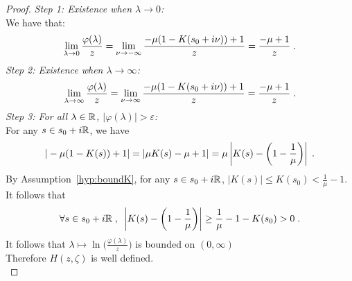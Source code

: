 \documentclass[11pt]{amsart}
\begin{document}
\begin{proof}
\textit{Step 1: Existence when $\lambda \to 0$:}\\
We have that: 
\begin{align*}
    \lim_{\lambda \to 0}\frac{\varphi(\lambda)}{z} = \lim_{\nu\to-\infty}\frac{-\mu(1-K(s_0+i\nu))+1}{z} = \frac{-\mu+1}{z}
    \; .
\end{align*}
\textit{Step 2: Existence when $\lambda \to \infty$:}
\begin{align*}
    \lim_{\lambda \to \infty}\frac{\varphi(\lambda)}{z} = \lim_{\nu\to\infty}\frac{-\mu(1-K(s_0+i\nu))+1}{z} = \frac{-\mu+1}{z}
    \; .
\end{align*}
\textit{Step 3: For all $\lambda \in \mathbb{R}$, $|\varphi(\lambda)| > \varepsilon$: }\\
For any $s \in s_0 + i\mathbb{R}$, we have
    \begin{align*}
        |-\mu(1-K(s))+1| = |\mu K(s) - \mu + 1| = \mu \left|K(s) - \left(1-\frac{1}{\mu}\right)\right|
        \; .
    \end{align*}
By Assumption~\ref{hyp:boundK}, for any $s \in s_0 + i\mathbb{R}$, $|K(s)| \leq K(s_0) < \frac{1}{\mu} - 1$. It follows that
\begin{align*}
    \forall s \in s_0 + i\mathbb{R}
    \; , \enspace
    \left|K(s) - \left(1-\frac{1}{\mu}\right)\right| \geq \frac{1}\mu - 1 - K(s_0) > 0
    \; .
\end{align*}
It follows that $\lambda \mapsto \ln\Big(\frac{\varphi(\lambda)}{z}\Big)$ is bounded on $(0, \infty)$\\

Therefore
$H(z,\zeta)$ is well defined.\\


\end{proof}
\end{document}

